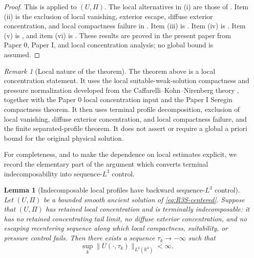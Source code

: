 \documentclass[11pt]{amsart}
\numberwithin{equation}{section}
\theoremstyle{plain}
\newtheorem{lemma}[theorem]{Lemma}
\theoremstyle{definition}
\theoremstyle{remark}
\newtheorem{remark}[theorem]{Remark}
\begin{document}
\begin{proof}
This is  applied to
\((U,\Pi)\).  The local alternatives in (i) are those of
.  Item (ii) is the exclusion of local
vanishing, exterior escape, diffuse exterior concentration, and local
compactness failure in .  Item (iii) is
.  Item (iv) is
.  Item (v) is
, and item (vi) is
.  These results are proved in
the present paper from Paper 0, Paper I, and local concentration analysis;
no global bound is assumed.
\end{proof}

\begin{remark}[Local nature of the theorem]
\label{rem:R3S-local-nature}
The theorem above is a local concentration statement.  It uses the local
suitable-weak-solution compactness and pressure normalization developed from
the Caffarelli--Kohn--Nirenberg theory \cite{CKN1982}, together with the
Paper 0 local concentration input and the Paper I Seregin compactness theorem.
It then uses terminal profile decomposition, exclusion of local vanishing,
diffuse exterior concentration, and local compactness failure, and the finite
separated-profile theorem.  It does not
assert or require a global a priori bound for the original physical solution.
\end{remark}

For completeness, and to make the dependence on local estimates explicit, we
record the elementary part of the argument which converts terminal
indecomposability into sequence-\(L^3\) control.

\begin{lemma}[Indecomposable local profiles have backward sequence-\(L^3\) control]
\label{lem:R3S-atomic-L3}
Let \((U,\Pi)\) be a bounded smooth ancient solution of
\eqref{eq:R3S-centered}.  Suppose that \((U,\Pi)\) has retained local
concentration and is terminally indecomposable: it has no retained
concentrating tail limit, no
diffuse exterior concentration, and no escaping recentering sequence along
which local compactness, suitability, or pressure control fails.  Then there
exists a sequence \(\tau_k\to-\infty\) such that
\begin{equation}\label{eq:R3S-atomic-L3}
   \sup_k \|U(\cdot,\tau_k)\|_{L^3(\mathbb R^3)}<\infty .
\end{equation}
\end{lemma}
\end{document}
